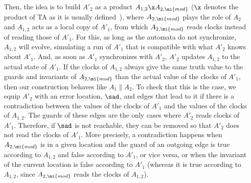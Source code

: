 \documentclass{LMCS}
\theoremstyle{plain}\newtheorem*{prop11}{Proposition~\ref{prop:states} bis}
\begin{document}
Then, the idea is to build $A'_2$ as a product $A_{1,2}\x A_{2,\mi{mod}}$
($\x$ denotes the product of TA as it is usually defined~\cite{AD94}),
where $A_{2,\mi{mod}}$ plays the role of $A_2$ and $A_{1,2}$ acts as a
local copy of $A'_1$, from which $A_{2,\mi{mod}}$ reads clocks instead of
reading those of $A'_1$.
For this, as long as the automata do not synchronize, $A_{1,2}$ will evolve,
simulating a run of $A'_1$ that is compatible with what $A'_2$ knows about
$A'_1$.
And, as soon as $A'_1$ synchronizes with $A'_2$, $A'_2$ updates
$A_{1,2}$ to the actual state of $A'_1$.
If the clocks of $A_{1,2}$ always give the same truth value to the guards and
invariants of $A_{2,\mi{mod}}$ than the actual value of the clocks of $A'_1$, then our
construction behaves like $A_1 \parallel A_2$. To check that this is the case,
we equip $A'_2$ with an error location, $\sad$, and edges that lead to it if there is a
contradiction between the values of the clocks of $A'_1$ and the values of the
clocks of $A_{1,2}$. The guards of these edges are the only cases where
$A'_2$ reads clocks of $A'_1$. Therefore, if $\sad$ is not
reachable, they can be removed so that $A'_2$ does not read the clocks of
$A'_1$.
More precisely, a contradiction happens when $A_{2,\mi{mod}}$ is in a given
location and the guard of an outgoing edge is true according to $A_{1,2}$ and
false according to $A'_1$, or vice versa, or when the invariant of the current
location is false according to $A'_1$ (whereas it is true according to
$A_{1,2}$, since $A_{2,\mi{mod}}$ reads the clocks of $A_{1,2}$).
\end{document}
